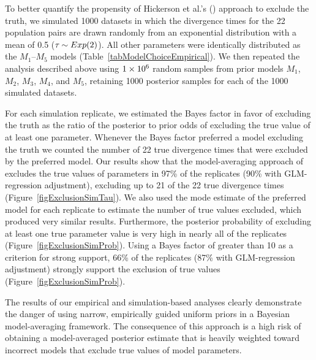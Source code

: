 To better quantify the propensity of Hickerson et al.'s
(\citeyear{Hickerson2013}) approach to exclude the truth, we simulated 1000
datasets in which the divergence times for the 22 population pairs are drawn
randomly from an exponential distribution with a mean of 0.5 ($\tau_{} \sim
Exp(2)$).
All other parameters were identically distributed as the $M_1$--$M_5$ models
(Table~\ref{tabModelChoiceEmpirical}).
We then repeated the analysis described above using $1\times 10^{6}$ random samples from
prior models $M_1$, $M_2$, $M_3$, $M_4$, and $M_5$, retaining 1000 posterior
samples for each of the 1000 simulated datasets.

For each simulation replicate, we estimated the Bayes factor in favor
of excluding the truth as the ratio of the posterior to prior odds of
excluding the true value of at least one parameter.
Whenever the Bayes factor preferred a model excluding the truth we counted
the number of 22 true divergence times that were excluded by the preferred
model.
Our results show that the model-averaging approach of \citet{Hickerson2013}
excludes the true values of parameters in 97\% of the replicates (90\% with
GLM-regression adjustment), excluding up to 21 of the 22 true divergence times
(Figure~\ref{figExclusionSimTau}).
We also used the mode estimate of the preferred model for each replicate to
estimate the number of true values excluded, which produced very similar
results.
Furthermore, the posterior probability of excluding at least one true parameter
value is very high in nearly all of the replicates
(Figure~\ref{figExclusionSimProb}).
Using a Bayes factor of greater than 10 as a criterion for strong support, 66\%
of the replicates (87\% with GLM-regression adjustment) strongly support the
exclusion of true values (Figure~\ref{figExclusionSimProb}).

The results of our empirical and simulation-based analyses clearly demonstrate
the danger of using narrow, empirically guided uniform priors in a Bayesian
model-averaging framework.
The consequence of this approach is a high risk of obtaining a model-averaged
posterior estimate that is heavily weighted toward incorrect models that
exclude true values of model parameters.


